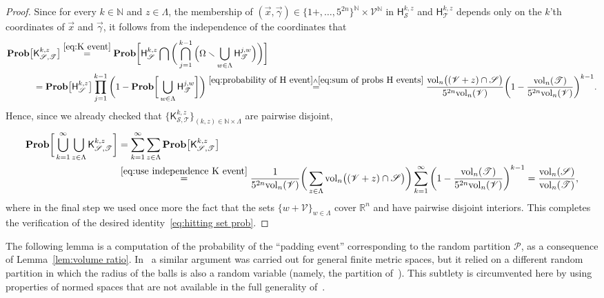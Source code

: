 \documentclass[11pt,reqno]{amsart}
\renewcommand{\setminus}{\smallsetminus}
\newcommand{\R}{\mathbb R}
\theoremstyle{remark}
\newcommand{\N}{\mathbb N}
\renewcommand{\Pr}{\mathbf{Prob}}
\newcommand{\vol}{\mathrm{vol}}
\renewcommand{\1}{\mathbf 1}
\newcommand{\Part}{\mathscr{P}}
\newcommand{\DD}{\mathscr{V}}
\begin{document}
\begin{proof}
 Since for every $k\in \N$ and $z\in \Lambda$, the membership of $(\vec{x},\vec{\gamma})\in  \{1+,\ldots, 5^{2n}\}^\N\times  \DD^\N$ in $\mathsf{H}_{\mathscr{S}}^{k,z}$ and $\mathsf{H}_{\mathscr{T}}^{k,z}$ depends only on the $k$'th coordinates of $\vec{x}$ and $\vec{\gamma}$, it follows from the independence of the coordinates that
 \begin{align}\label{eq:use independence K event}
 \begin{split}
 \Pr\big[&\mathsf{K}_{\mathscr{S,T}}^{k,z}\big]\stackrel{\eqref{eq:K event}}{=}\Pr\bigg[\mathsf{H}_{\mathscr{S}}^{k,z} \bigcap \bigg(\bigcap_{j=1}^{k-1} \Big(\Omega \setminus \bigcup_{w\in \Lambda}\mathsf{H}_{\mathscr{T}}^{j,w}\Big)\bigg)\bigg]\\&=\Pr\big[\mathsf{H}_{\mathscr{S}}^{k,z} \big]\prod_{j=1}^{k-1} \bigg(1-\Pr\bigg[\bigcup_{w\in \Lambda}\mathsf{H}_{\mathscr{T}}^{j,w}\bigg]\bigg)
 \stackrel{\eqref{eq:probability of H event}\wedge \eqref{eq:sum of probs H events}}{=}\frac{\vol_n\big((\DD+z)\cap\mathscr{S}\big)}{5^{2n}\vol_n(\DD)}\bigg(1-\frac{\vol_n(\mathscr{T})}{{5^{2n}\vol_n(\DD)}}\bigg)^{k-1}.
 \end{split}
 \end{align}
Hence, since we already checked that $\{\mathsf{K}_{\mathscr{S,T}}^{k,z}\}_{(k,z)\in \N\times \Lambda}$ are pairwise disjoint,
\begin{align*}
\Pr\bigg[\bigcup_{k=1}^\infty\bigcup_{z\in \Lambda}\mathsf{K}_{\mathscr{S,T}}^{k,z}\bigg]&=\sum_{k=1}^\infty\sum_{z\in \Lambda}\Pr\big[\mathsf{K}_{\mathscr{S,T}}^{k,z}\big]
\\&\stackrel{\eqref{eq:use independence K event}}{=}\frac{1}{5^{2n}\vol_n(\DD)}\bigg(\sum_{z\in \Lambda} \vol_n\big((\DD+z)\cap\mathscr{S}\big)\bigg)\sum_{k=1}^\infty \bigg(1-\frac{\vol_n(\mathscr{T})}{{5^{2n}\vol_n(\DD)}}\bigg)^{k-1}=\frac{\vol_n(\mathscr{S})}{\vol_n(\mathscr{T})},
\end{align*}
where in the final step we used once more the fact that the sets $\{w+\DD\}_{w\in \Lambda}$ cover $\R^n$ and have pairwise disjoint interiors. This completes the verification of the desired identity~\eqref{eq:hitting set prob}.
\end{proof}

The following lemma is a computation of the probability of the ``padding event'' corresponding to the random partition $\Part$, as  a consequence of Lemma~\ref{lem:volume ratio}. In~\cite{MN07}  a similar argument was carried out for general finite metric spaces, but it relied on a different random partition in which the radius of the balls is also a random variable (namely, the partition of~\cite{CKR04}). This subtlety is circumvented here by using  properties of normed spaces that are not available in the full generality of~\cite{MN07}.
\end{document}

